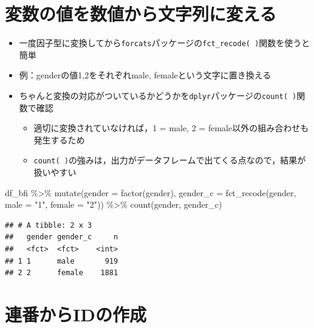 \documentclass[
  xelatex,ja=standard, b5paper]{bxjsbook}
\newenvironment{Shaded}{\begin{snugshade}}{\end{snugshade}}
\newcommand{\AttributeTok}[1]{\textcolor[rgb]{0.77,0.63,0.00}{#1}}
\newcommand{\FunctionTok}[1]{\textcolor[rgb]{0.00,0.00,0.00}{#1}}
\newcommand{\NormalTok}[1]{#1}
\newcommand{\SpecialCharTok}[1]{\textcolor[rgb]{0.00,0.00,0.00}{#1}}
\newcommand{\StringTok}[1]{\textcolor[rgb]{0.31,0.60,0.02}{#1}}
\providecommand{\tightlist}{%
  \setlength{\itemsep}{0pt}\setlength{\parskip}{0pt}}
\begin{document}
\hypertarget{ux5909ux6570ux306eux5024ux3092ux6570ux5024ux304bux3089ux6587ux5b57ux5217ux306bux5909ux3048ux308b}{%
\section{変数の値を数値から文字列に変える}\label{ux5909ux6570ux306eux5024ux3092ux6570ux5024ux304bux3089ux6587ux5b57ux5217ux306bux5909ux3048ux308b}}

\begin{itemize}
\tightlist
\item
  一度因子型に変換してから\texttt{forcats}パッケージの\texttt{fct\_recode(\ )}関数を使うと簡単
\item
  例：genderの値1,2をそれぞれmale, femaleという文字に置き換える
\item
  ちゃんと変換の対応がついているかどうかを\texttt{dplyr}パッケージの\texttt{count(\ )}関数で確認

  \begin{itemize}
  \tightlist
  \item
    適切に変換されていなければ，1 = male, 2 = female以外の組み合わせも発生するため
  \item
    \texttt{count(\ )}の強みは，出力がデータフレームで出てくる点なので，結果が扱いやすい
  \end{itemize}
\end{itemize}

\begin{Shaded}
\begin{Highlighting}[]
\NormalTok{df\_bfi }\SpecialCharTok{\%\textgreater{}\%}
  \FunctionTok{mutate}\NormalTok{(}\AttributeTok{gender =} \FunctionTok{factor}\NormalTok{(gender),}
         \AttributeTok{gender\_c =} \FunctionTok{fct\_recode}\NormalTok{(gender, }
                               \AttributeTok{male   =} \StringTok{"1"}\NormalTok{,}
                               \AttributeTok{female =} \StringTok{"2"}\NormalTok{)) }\SpecialCharTok{\%\textgreater{}\%} 
  \FunctionTok{count}\NormalTok{(gender, gender\_c)}
\end{Highlighting}
\end{Shaded}

\begin{verbatim}
## # A tibble: 2 x 3
##   gender gender_c     n
##   <fct>  <fct>    <int>
## 1 1      male       919
## 2 2      female    1881
\end{verbatim}

\hypertarget{mu-seq}{%
\section{連番からIDの作成}\label{mu-seq}}
\end{document}
